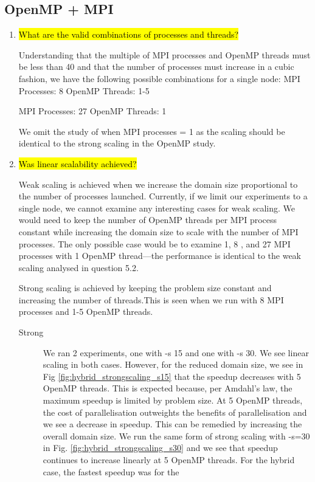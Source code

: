\documentclass{article}
\begin{document}
\subsection{OpenMP + MPI}
\begin{enumerate}
	\item \hl{What are the valid combinations of processes and threads?}

	Understanding that the multiple of MPI processes and OpenMP threads must be less than 40 and that the number of processes must increase in a cubic fashion, we have the following possible combinations for a single node:
	MPI Processes: 8
	OpenMP Threads: 1-5
	
	MPI Processes: 27
	OpenMP Threads: 1
	
	We omit the study of when MPI processes = 1 as the scaling should be identical to the strong scaling in the OpenMP study.
	
	\item \hl{Was linear scalability achieved?}
	
	Weak scaling is achieved when we increase the domain size proportional to the number of processes launched. Currently, if we limit our experiments to a single node, we cannot examine any interesting cases for weak scaling. We would need to keep the number of OpenMP threads per MPI process constant while increasing the domain size to scale with the number of MPI processes. The only possible case would be to examine 1, 8 , and 27 MPI processes with 1 OpenMP thread---the performance is identical to the weak scaling analysed in question 5.2.
	
	Strong scaling is achieved by keeping the problem size constant and increasing the number of threads.This is seen when we run with 8 MPI processes and 1-5 OpenMP threads. 
	
	\begin{description}
		\item[Strong] We ran 2 experiments, one with -s 15 and one with -s 30. We see linear scaling in both cases. However, for the reduced domain size, we see in Fig \ref{fig:hybrid_strongscaling_s15} that the speedup decreases with 5 OpenMP threads. This is expected because, per Amdahl's law, the maximum speedup is limited by problem size. At 5 OpenMP threads, the cost of parallelisation outweights the benefits of parallelisation and we see a decrease in speedup. This can be remedied by increasing the overall domain size. We run the same form of strong scaling with -s=30 in Fig. \ref{fig:hybrid_strongscaling_s30} and we see that speedup continues to increase linearly at 5 OpenMP threads. For the hybrid case, the fastest speedup was for the 
	\end{description}
	

\end{enumerate}
\end{document}
